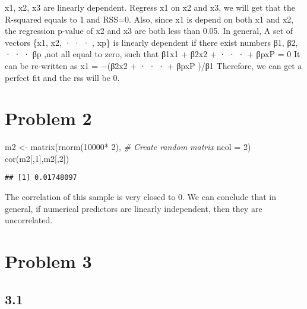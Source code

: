 \documentclass[
  11pt,
]{article}
\newenvironment{Shaded}{\begin{snugshade}}{\end{snugshade}}
\newcommand{\AttributeTok}[1]{\textcolor[rgb]{0.77,0.63,0.00}{#1}}
\newcommand{\CommentTok}[1]{\textcolor[rgb]{0.56,0.35,0.01}{\textit{#1}}}
\newcommand{\DecValTok}[1]{\textcolor[rgb]{0.00,0.00,0.81}{#1}}
\newcommand{\FunctionTok}[1]{\textcolor[rgb]{0.00,0.00,0.00}{#1}}
\newcommand{\NormalTok}[1]{#1}
\newcommand{\OtherTok}[1]{\textcolor[rgb]{0.56,0.35,0.01}{#1}}
\newcommand{\SpecialCharTok}[1]{\textcolor[rgb]{0.00,0.00,0.00}{#1}}
\begin{document}
x1, x2, x3 are linearly dependent. Regress x1 on x2 and x3, we will get
that the R-squared equals to 1 and RSS=0. Also, since x1 is depend on
both x1 and x2, the regression p-value of x2 and x3 are both less than
0.05. In general, A set of vectors \{x1, x2, · · · , xp\} is linearly
dependent if there exist numbers β1, β2, · · · βp ,not all equal to
zero, such that β1x1 + β2x2 + · · · + βpxP = 0 It can be re-written as
x1 = −(β2x2 + · · · + βpxP )/β1 Therefore, we can get a perfect fit and
the rss will be 0.

\hypertarget{problem-2}{%
\section{Problem 2}\label{problem-2}}

\begin{Shaded}
\begin{Highlighting}[]
\NormalTok{m2 }\OtherTok{\textless{}{-}} \FunctionTok{matrix}\NormalTok{(}\FunctionTok{rnorm}\NormalTok{(}\DecValTok{10000}\SpecialCharTok{*} \DecValTok{2}\NormalTok{), }\CommentTok{\# Create random matrix}
\AttributeTok{ncol =} \DecValTok{2}\NormalTok{)}
\FunctionTok{cor}\NormalTok{(m2[,}\DecValTok{1}\NormalTok{],m2[,}\DecValTok{2}\NormalTok{])}
\end{Highlighting}
\end{Shaded}

\begin{verbatim}
## [1] 0.01748097
\end{verbatim}

The correlation of this sample is very closed to 0. We can conclude that
in general, if numerical predictors are linearly independent, then they
are uncorrelated.

\hypertarget{problem-3}{%
\section{Problem 3}\label{problem-3}}

\hypertarget{section}{%
\subsection{3.1}\label{section}}
\end{document}
